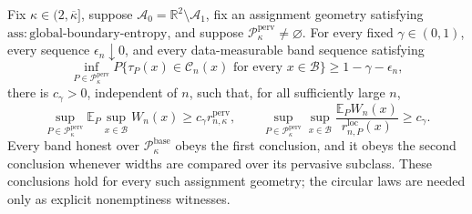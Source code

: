 Fix \(\kappa\in(2,\overline\kappa]\), suppose \(\mathcal A_0=\mathbb R^2\setminus\mathcal A_1\), fix an assignment geometry satisfying \(\mathrm{ass:global\text{-}boundary\text{-}entropy}\), and suppose \(\mathcal P_{\kappa}^{\mathrm{perv}}\ne\varnothing\). For every fixed \(\gamma\in(0,1)\), every sequence \(\epsilon_n\downarrow0\), and every data-measurable band sequence satisfying
\[
 \inf_{P\in\mathcal P_{\kappa}^{\mathrm{perv}}}
 P\{\tau_P(x)\in\mathcal C_n(x)\text{ for every }x\in\mathcal B\}
 \ge1-\gamma-\epsilon_n,
\]
there is \(c_\gamma>0\), independent of \(n\), such that, for all sufficiently large \(n\),
\[
 \sup_{P\in\mathcal P_{\kappa}^{\mathrm{perv}}}
 \mathbb E_P\sup_{x\in\mathcal B}W_n(x)
 \ge c_\gamma r_{n,\kappa}^{\mathrm{perv}},
 \qquad
 \sup_{P\in\mathcal P_{\kappa}^{\mathrm{perv}}}\sup_{x\in\mathcal B}
 \frac{\mathbb E_PW_n(x)}{r_{n,P}^{\mathrm{loc}}(x)}
 \ge c_\gamma.
\]
Every band honest over \(\mathcal P_{\kappa}^{\mathrm{base}}\) obeys the first conclusion, and it obeys the second conclusion whenever widths are compared over its pervasive subclass. These conclusions hold for every such assignment geometry; the circular laws are needed only as explicit nonemptiness witnesses.
